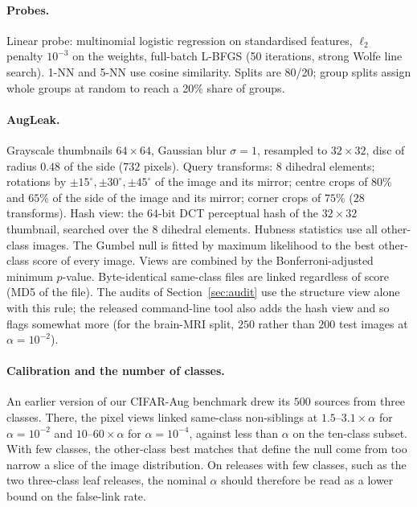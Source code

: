 \paragraph{Probes.} Linear probe: multinomial logistic regression on standardised features, $\ell_2$ penalty $10^{-3}$ on the weights, full-batch L-BFGS (50 iterations, strong Wolfe line search). 1-NN and 5-NN use cosine similarity. Splits are 80/20; group splits assign whole groups at random to reach a 20\% share of groups.

\paragraph{AugLeak.} Grayscale thumbnails $64\times64$, Gaussian blur $\sigma=1$, resampled to $32\times32$, disc of radius $0.48$ of the side ($732$ pixels). Query transforms: $8$ dihedral elements; rotations by $\pm15^\circ,\pm30^\circ,\pm45^\circ$ of the image and its mirror; centre crops of $80\%$ and $65\%$ of the side of the image and its mirror; corner crops of $75\%$ ($28$ transforms). Hash view: the $64$-bit DCT perceptual hash of the $32\times32$ thumbnail, searched over the $8$ dihedral elements. Hubness statistics use all other-class images. The Gumbel null is fitted by maximum likelihood to the best other-class score of every image. Views are combined by the Bonferroni-adjusted minimum $p$-value. Byte-identical same-class files are linked regardless of score (MD5 of the file). The audits of Section~\ref{sec:audit} use the structure view alone with this rule; the released command-line tool also adds the hash view and so flags somewhat more (for the brain-MRI split, $250$ rather than $200$ test images at $\alpha=10^{-2}$).

\paragraph{Calibration and the number of classes.} An earlier version of our CIFAR-Aug benchmark drew its $500$ sources from three classes. There, the pixel views linked same-class non-siblings at $1.5$--$3.1\times\alpha$ for $\alpha=10^{-2}$ and $10$--$60\times\alpha$ for $\alpha=10^{-4}$, against less than $\alpha$ on the ten-class subset. With few classes, the other-class best matches that define the null come from too narrow a slice of the image distribution. On releases with few classes, such as the two three-class leaf releases, the nominal $\alpha$ should therefore be read as a lower bound on the false-link rate.

